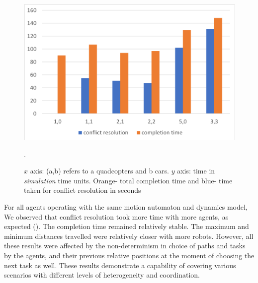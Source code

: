 \begin{figure}
\includegraphics[scale=0.3]{figs/completion.png}\hfill
\caption{\small  $x$ axis:  (a,b) refers to a quadcopters and b cars. $y$ axis: time in \emph{simulation} time units. Orange-  total completion time and blue- time taken for conflict resolution in seconds}. 
\label{fig:completionstats}
\end{figure}



 For all agents operating with the same motion automaton and dynamics model, We observed that conflict resolution took more time with more agents, as expected (). The completion time remained relatively stable. The maximum and minimum distances travelled were relatively closer with more robots. However, all these results were affected by the non-determinism in choice of paths and tasks by the agents, and their previous relative positions at the moment of choosing the next task as well. These results demonstrate a capability of covering various scenarios with different levels of heterogeneity and coordination.
 
